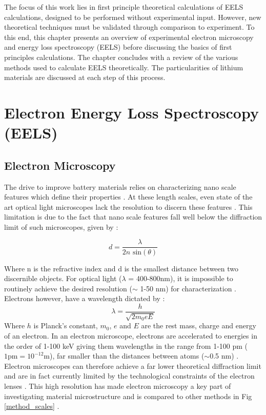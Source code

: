 


The focus of this work lies in  first principle theoretical calculations of EELS calculations, designed to be performed without experimental input.  However, new theoretical techniques must be validated through comparison to experiment.  To this end, this chapter presents an overview of experimental electron microscopy and  energy loss spectroscopy (EELS) before discussing the basics of first principles calculations. The chapter concludes with a review of the various methods used to calculate EELS theoretically.  The particularities of lithium materials are discussed at each step of this process.  
 
\section{Electron Energy Loss Spectroscopy (EELS)}

\subsection{Electron Microscopy}
The drive to improve battery materials relies on characterizing  nano scale features which define their properties \cite{goldstein_electron_2003}.  At these length scales, even state of the art optical light microscopes lack the resolution to discern these features \cite{rust_sub-diffraction-limit_2006}.  This limitation is due to the fact that nano scale features fall well below the diffraction limit of such microscopes, given by \cite{hecht}: 

\begin{equation}
	d = \frac{\lambda}{2n\textrm{ sin}(\theta)}
\end{equation}

Where n is the refractive index and d is the smallest distance between two discernible objects. For optical light ($\lambda$ = 400-800nm), it is impossible to routinely achieve the desired resolution ($\sim$ 1-50 nm) for characterization \cite{rust_sub-diffraction-limit_2006}.  Electrons however, have a wavelength dictated by \cite{goldstein_electron_2003}: 
\begin{equation}
 \lambda = \frac{h}{\sqrt{2 m_0 e E}}
\end{equation}
Where $h$ is Planck's constant, $m_0$, $e$ and $E$ are the rest mass, charge and energy of an electron.  In an electron microscope, electrons are accelerated to energies in the order of 1-100 keV giving them wavelengths in the range from 1-100 pm ($1\mathrm{pm}=10^{-12}$m), far  smaller than the distances between atoms ($\sim$0.5 nm) \cite{morales_laser_1998}.  Electron microscopes can therefore achieve a far lower theoretical diffraction limit  and are in fact currently limited by the technological constraints of the electron  lenses \cite{goldstein_electron_2003}.  This high resolution has made electron microscopy a key part of investigating material microstructure and is compared to other methods  in Fig \ref{method_scales} \cite{inkson_2_2016}. \\


